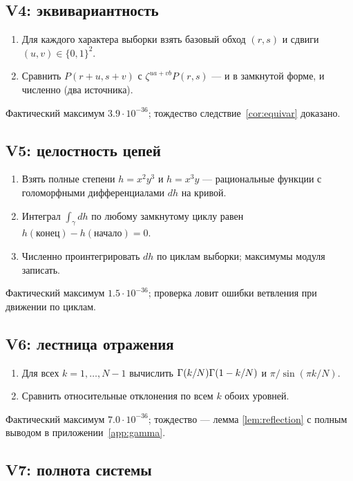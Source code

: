 \subsection{V4: эквивариантность}

\begin{enumerate}[leftmargin=2em, itemsep=0.1em]
\item Для каждого характера выборки взять базовый обход $(r,s)$ и
  сдвиги $(u,v)\in\{0,1\}^2$.
\item Сравнить $P(r+u,s+v)$ с $\zeta^{ua+vb}P(r,s)$ --- и в
  замкнутой форме, и численно (два источника).
\end{enumerate}
Фактический максимум $3.9\cdot10^{-36}$; тождество
следствие~\ref{cor:equivar} доказано.

\subsection{V5: целостность цепей}

\begin{enumerate}[leftmargin=2em, itemsep=0.1em]
\item Взять полные степени $h=x^2y^3$ и $h=x^3y$ --- рациональные
  функции с голоморфными дифференциалами $dh$ на кривой.
\item Интеграл $\int_\gamma dh$ по любому замкнутому циклу равен
  $h(\text{конец})-h(\text{начало})=0$.
\item Численно проинтегрировать $dh$ по циклам выборки;
  максимумы модуля записать.
\end{enumerate}
Фактический максимум $1.5\cdot10^{-36}$; проверка ловит ошибки
ветвления при движении по циклам.

\subsection{V6: лестница отражения}

\begin{enumerate}[leftmargin=2em, itemsep=0.1em]
\item Для всех $k=1,\dots,N-1$ вычислить
  $\Gamma(k/N)\Gamma(1-k/N)$ и $\pi/\sin(\pi k/N)$.
\item Сравнить относительные отклонения по всем $k$ обоих уровней.
\end{enumerate}
Фактический максимум $7.0\cdot10^{-36}$; тождество --- лемма
\ref{lem:reflection} с полным выводом в приложении~\ref{app:gamma}.

\subsection{V7: полнота системы}

